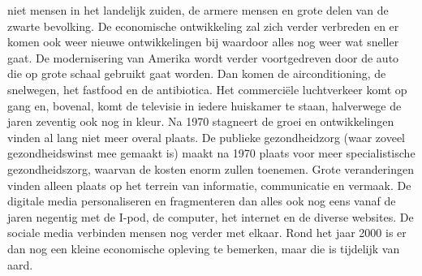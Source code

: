 \documentclass[]{book}
\begin{document}
niet mensen in het landelijk zuiden, de armere mensen en grote delen van
de zwarte bevolking. De economische ontwikkeling zal zich verder
verbreden en er komen ook weer nieuwe ontwikkelingen bij waardoor alles
nog weer wat sneller gaat. De modernisering van Amerika wordt verder
voortgedreven door de auto die op grote schaal gebruikt gaat worden. Dan
komen de airconditioning, de snelwegen, het fastfood en de antibiotica.
Het commerciële luchtverkeer komt op gang en, bovenal, komt de televisie
in iedere huiskamer te staan, halverwege de jaren zeventig ook nog in
kleur. Na 1970 stagneert de groei en ontwikkelingen vinden al lang niet
meer overal plaats. De publieke gezondheidzorg (waar zoveel
gezondheidswinst mee gemaakt is) maakt na 1970 plaats voor meer
specialistische gezondheidszorg, waarvan de kosten enorm zullen
toenemen. Grote veranderingen vinden alleen plaats op het terrein van
informatie, communicatie en vermaak. De digitale media personaliseren en
fragmenteren dan alles ook nog eens vanaf de jaren negentig met de
I-pod, de computer, het internet en de diverse websites. De sociale
media verbinden mensen nog verder met elkaar. Rond het jaar 2000 is er
dan nog een kleine economische opleving te bemerken, maar die is
tijdelijk van aard.
\end{document}
